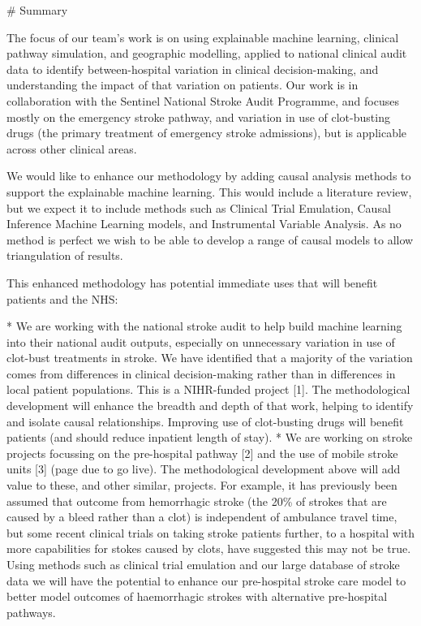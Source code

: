 \begin{markdown}
# Summary

The focus of our team's work is on using explainable machine learning, clinical pathway simulation, and geographic modelling, applied to national clinical audit data to identify between-hospital variation in clinical decision-making, and understanding the impact of that variation on patients. Our work is in collaboration with the Sentinel National Stroke Audit Programme, and focuses mostly on the emergency stroke pathway, and variation in use of clot-busting drugs (the primary treatment of emergency stroke admissions), but is applicable across other clinical areas.

We would like to enhance our methodology by adding causal analysis methods to support the explainable machine learning. This would include a literature review, but we expect it to include methods such as Clinical Trial Emulation, Causal Inference Machine Learning models, and Instrumental Variable Analysis. As no method is perfect we wish to be able to develop a range of causal models to allow triangulation of results.

This enhanced methodology has potential immediate uses that will benefit patients and the NHS:

* We are working with the national stroke audit to help build machine learning into their national audit outputs, especially on unnecessary variation in use of clot-bust treatments in stroke. We have identified that a majority of the variation comes from differences in clinical decision-making rather than in differences in local patient populations. This is a NIHR-funded project [1]. The methodological development will enhance the breadth and depth of that work, helping to identify and isolate causal relationships. Improving use of clot-busting drugs will benefit patients (and should reduce inpatient length of stay).
* We are working on stroke projects focussing on the pre-hospital pathway [2] and the use of mobile stroke units [3] (page due to go live). The methodological development above will add value to these, and other similar, projects. For example, it has previously been assumed that outcome from hemorrhagic stroke (the 20\% of strokes that are caused by a bleed rather than a clot) is independent of ambulance travel time, but some recent clinical trials on taking stroke patients further, to a hospital with more capabilities for stokes caused by clots, have suggested this may not be true. Using methods such as clinical trial emulation and our large database of stroke data we will have the potential to enhance our pre-hospital stroke care model to better model outcomes of haemorrhagic strokes with alternative pre-hospital pathways.


\end{markdown}
